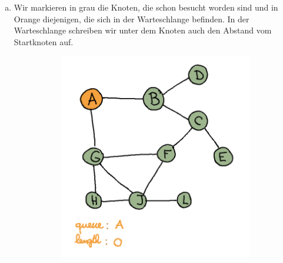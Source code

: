 \begin{enumerate}[(a)]
\item Wir markieren in grau die Knoten, die schon besucht worden sind und in Orange diejenigen, die sich in der Warteschlange befinden. In der Warteschlange schreiben wir unter dem Knoten auch den Abstand vom Startknoten auf.
\begin{figure}[H]
    \centering
    \begin{subfigure}[h]{0.45\textwidth}
    \includegraphics[width=\textwidth]{Pictures/SP/panda_gebissen_0.png}
    \end{subfigure}
    \vspace{5mm}
    \qquad
    \begin{subfigure}[h]{0.45\textwidth}
    \raggedleft

\end{subfigure}
\end{figure}
\end{enumerate}
